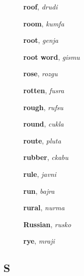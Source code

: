 \documentclass[12pt]{book}
\begin{document}
\begin{description}
\item[ ] \textbf{roof}, \textit{drudi}

\item[ ] \textbf{room}, \textit{kumfa}

\item[ ] \textbf{root}, \textit{genja}

\item[ ] \textbf{root word}, \textit{gismu}

\item[ ] \textbf{rose}, \textit{rozgu}

\item[ ] \textbf{rotten}, \textit{fusra}

\item[ ] \textbf{rough}, \textit{rufsu}

\item[ ] \textbf{round}, \textit{cukla}

\item[ ] \textbf{route}, \textit{pluta}

\item[ ] \textbf{rubber}, \textit{ckabu}

\item[ ] \textbf{rule}, \textit{javni}

\item[ ] \textbf{run}, \textit{bajra}

\item[ ] \textbf{rural}, \textit{nurma}

\item[ ] \textbf{Russian}, \textit{rusko}

\item[ ] \textbf{rye}, \textit{mraji}



\end{description}



\subsection{S} %
\end{document}

